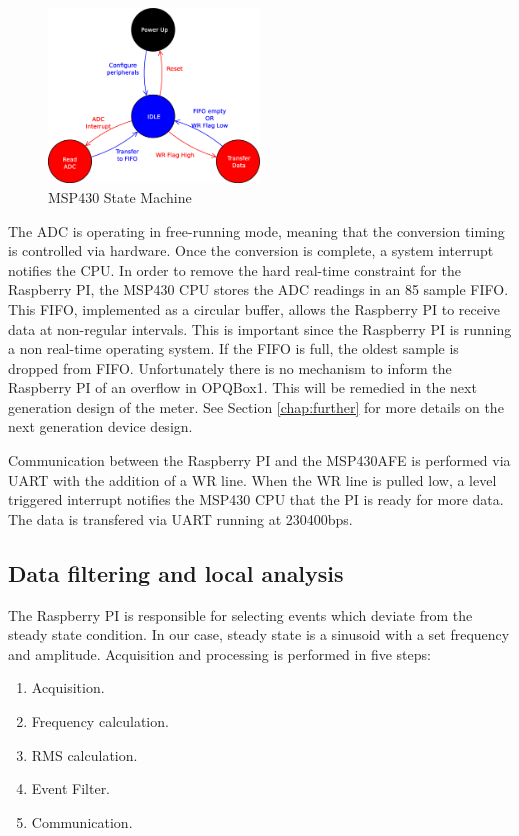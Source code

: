 \begin{figure}[h!]
\centering
\includegraphics[width=0.5\textwidth]{img/MSP430StateMachine.eps}
\caption{MSP430 State Machine}
\end{figure}

The ADC is operating in free-running mode, meaning that the conversion timing is controlled via hardware. Once the conversion is complete, a system interrupt notifies the CPU. In order to remove the hard real-time constraint for the Raspberry PI, the MSP430 CPU stores the ADC readings in an 85 sample FIFO. This FIFO, implemented as a circular buffer,  allows the Raspberry PI to receive data at non-regular intervals. This is important since the Raspberry PI is running a non real-time operating system. If the FIFO is full, the oldest sample is dropped from FIFO. Unfortunately there is no mechanism to inform the Raspberry PI of an overflow in OPQBox1. This will be remedied in the next generation design of the meter. See Section \ref{chap:further} for more details on the next generation device design.

Communication between the Raspberry PI and the MSP430AFE is performed via UART with the addition of a WR line. When the WR line is pulled low, a level triggered interrupt notifies the MSP430 CPU that the PI is ready for more data. The data is transfered via UART running at 230400bps.

\subsection{Data filtering and local analysis}

The Raspberry PI is responsible for selecting events which deviate from the steady state condition. In our case, steady state is a sinusoid with a set frequency and amplitude. Acquisition and processing is performed in five steps:

\begin{enumerate}
\item Acquisition.
\item Frequency calculation.
\item RMS calculation.
\item Event Filter.
\item Communication.
\end{enumerate}

